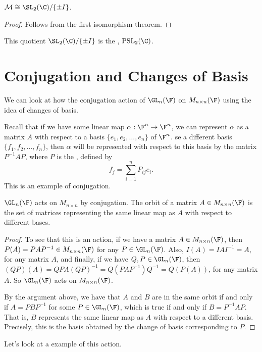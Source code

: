 \documentclass[a4]{scrreprt}
\newcommand{\newsection}{\section}
\begin{document}
\begin{corollary}
	$\mathcal{M} \cong \SL_2(\C) / \{\pm I\}$.
\end{corollary}
\begin{proof}
	Follows from the first isomorphism theorem.
\end{proof}

This quotient $\SL_2(\C) / \{\pm I\}$ is the , $\operatorname{PSL}_2(\C)$.


\newsection{Conjugation and Changes of Basis}

We can look at how the conjugation action of $\GL_{n} (\F)$ on $M_{n \times n}(\F)$ using the idea of changes of basis.

Recall that if we have some linear map $\alpha : \F^n \rightarrow \F^n$, we can represent $\alpha$ as a matrix $A$ with respect to a basis $\{e_1, e_2, \dots, e_n\}$ of $\F^n$.
se a different basis $\{f_1, f_2, \dots, f_n\}$, then $\alpha$ will be represented with respect to this basis by the matrix $P^{-1} A P$, where $P$ is the , defined by
$$
	f_j = \sum_{i = 1}^n P_{ij} e_i.
$$
This is an example of conjugation.

\begin{proposition}
	$\GL_n(\F)$ acts on $M_{n \times n}$ by conjugation. The orbit of a matrix $A \in M_{n \times n}(\F)$ is the set of matrices representing the same linear map as $A$ with respect to different bases.
\end{proposition}
\begin{proof}
	To see that this is an action, if we have a matrix $A \in M_{n \times n}(\F)$, then $P(A) = PAP^{-1} \in M_{n \times n}(\F)$ for any $P \in \GL_n(\F)$.
	Also, $I(A) = IAI^{-1} = A$, for any matrix $A$, and finally, if we have $Q, P \in \GL_n(\F)$, then $(QP)(A) = QPA (QP)^{-1} = Q(PAP^{-1})Q^{-1} = Q(P(A))$, for any matrix $A$.
	So $\GL_n(\F)$ acts on $M_{n \times n}(\F)$.

	By the argument above, we have that $A$ and $B$ are in the same orbit if and only if $A = PBP^{-1}$ for some $P \in \GL_n(\F)$, which is true if and only if $B = P^{-1}AP$.
	That is, $B$ represents the same linear map as $A$ with respect to a different basis. Precisely, this is the basis obtained by the change of basis corresponding to $P$.
\end{proof}

Let's look at a example of this action.
\end{document}
